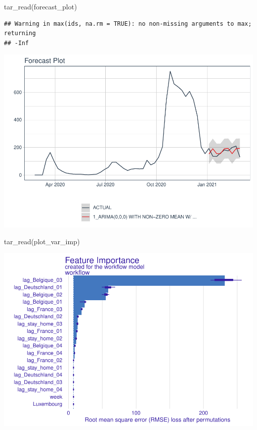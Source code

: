 \documentclass{article}
\newenvironment{Shaded}{\begin{snugshade}}{\end{snugshade}}
\newcommand{\FunctionTok}[1]{\textcolor[rgb]{0.00,0.00,0.00}{#1}}
\newcommand{\NormalTok}[1]{#1}
\begin{document}
\begin{Shaded}
\begin{Highlighting}[]
\FunctionTok{tar\_read}\NormalTok{(forecast\_plot)}
\end{Highlighting}
\end{Shaded}

\begin{verbatim}
## Warning in max(ids, na.rm = TRUE): no non-missing arguments to max; returning
## -Inf
\end{verbatim}

\includegraphics{paper_files/figure-latex/unnamed-chunk-6-1.pdf}

\begin{Shaded}
\begin{Highlighting}[]
\FunctionTok{tar\_read}\NormalTok{(plot\_var\_imp)}
\end{Highlighting}
\end{Shaded}

\includegraphics{paper_files/figure-latex/unnamed-chunk-7-1.pdf}
\end{document}
